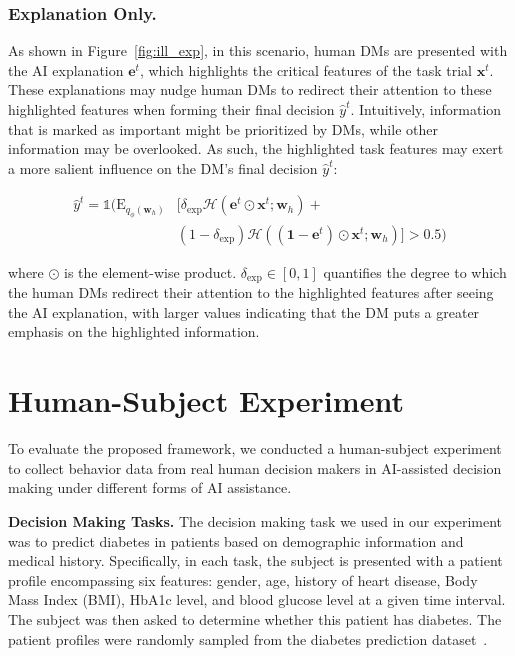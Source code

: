 \documentclass[letterpaper]{article} %
\newcommand{\my}[1]{\textcolor{blue}{[Ming: #1]}}
\newcommand{\zy}[1]{\textcolor{red}{[Zhuoyan: #1]}}
\begin{document}
\subsubsection{Explanation Only.}
As shown in Figure~\ref{fig:ill_exp}, in this scenario, human DMs are  presented with the AI explanation $\bm{e}^{t}$, which highlights the critical features of the task trial $\bm{x}^t$. These explanations may nudge human DMs to redirect their attention to these highlighted features when forming their final decision $\hat{y}^t$. Intuitively, information that is marked as important might be prioritized by DMs, while other information may be overlooked. As such, the highlighted task features may exert a more salient influence on the DM's final decision $\hat{y}^t$:
\begin{small}
\begin{equation}
\begin{split}
    \hat{y}^{t} = \mathds{1}(\mathrm{E}_{q_{\phi}(\bm{w}_h)} & [\delta_{\text{exp}} \mathcal{H}(\bm{e}^t \odot \boldsymbol{x}^t;\bm{w}_h) + \\
    &(1-\delta_{\text{exp}})\mathcal{H}((\bm{1}-\bm{e}^t) \odot \boldsymbol{x}^t;\bm{w}_h)]>0.5)
\end{split}
\end{equation}
\end{small}
\noindent where $\odot$ is the element-wise product. $\delta_{\text{exp}} \in [0,1]$ quantifies the degree to which the human DMs redirect their attention to the highlighted features after seeing the AI explanation, 
with larger values 
indicating that the DM puts a greater emphasis on the highlighted information.





\section{Human-Subject Experiment}
To evaluate the proposed framework, 
we conducted a human-subject experiment to collect behavior data from real human decision makers in AI-assisted decision making under different forms of AI assistance.

\vspace{2pt}
\noindent \textbf{Decision Making Tasks.} The decision making task we used in our experiment was to predict diabetes in patients based on demographic information and medical history. Specifically, in each task, the subject is presented with a patient profile encompassing six features: gender, age, history of heart disease, Body Mass Index (BMI), HbA1c level, and blood glucose level at a given time interval. The subject was then asked to determine whether this patient has diabetes. The patient profiles were randomly sampled from the diabetes prediction dataset~\cite{mustafaz_dia}. 
\end{document}
